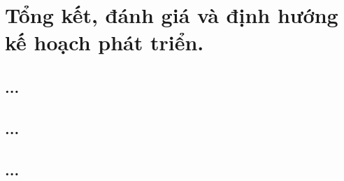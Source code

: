 \chapter{Tổng kết, đánh giá và định hướng kế hoạch phát triển.}

\section{...}
\section{...}
\section{...}
